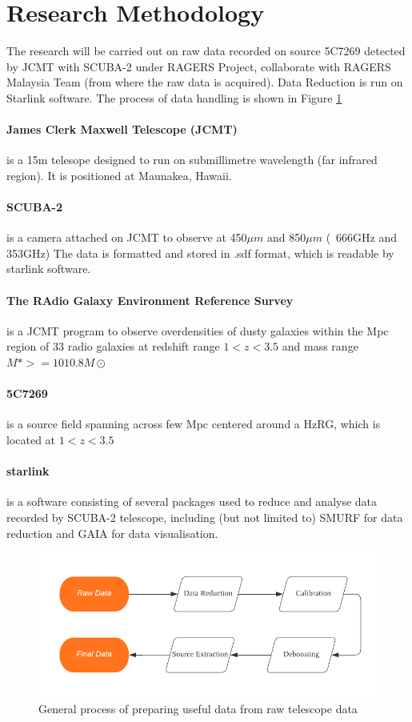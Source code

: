 \documentclass{article}
\begin{document}
\section{Research Methodology}

The research will be carried out on raw data recorded on source 5C7269 detected by JCMT with SCUBA-2 under RAGERS Project, collaborate with RAGERS Malaysia Team (from where the raw data is acquired). Data Reduction is run on Starlink software. The process of data handling is shown in Figure \ref{fig:flowchart1}

\paragraph{James Clerk Maxwell Telescope (JCMT)} is a 15m telesope designed to run on submillimetre wavelength (far infrared region). It is positioned at Maunakea, Hawaii.

\paragraph{SCUBA-2} is a camera attached on JCMT to observe at 450$\mu m$ and 850$\mu m$ (~666GHz and 353GHz) The data is formatted and stored in .sdf format, which is readable by starlink software.

\paragraph{The RAdio Galaxy Environment Reference Survey} is a JCMT program to observe overdensities of dusty galaxies within the Mpc region of 33 radio galaxies at redshift range $1 < z < 3.5$ and mass range $M\ast >=1010.8M\odot $ 

\paragraph{5C7269} is a source field spanning across few Mpc centered around a HzRG, which is located at $1 < z < 3.5$ 

\paragraph{starlink} is a software consisting of several packages used to reduce and analyse data recorded by SCUBA-2 telescope, including (but not limited to) SMURF for data reduction and GAIA for data visualisation.

\begin{figure}
    \includegraphics{Flowchart.png}
    \caption{General process of preparing useful data from raw telescope data}
    \label{fig:flowchart1}
\end{figure}
\end{document}
